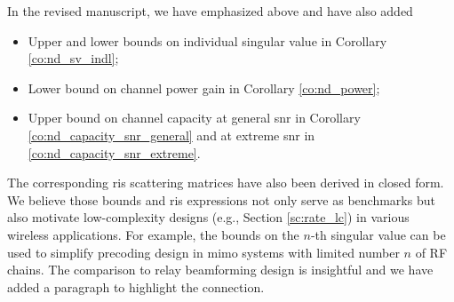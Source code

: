 \documentclass[
	fontsize=11pt,
	paper=a4,
	foldmarks=false
]{scrartcl}
\begin{document}
\begin{reviewer}
{		In the revised manuscript, we have emphasized above and have also added
		\begin{itemize}
			\item Upper and lower bounds on individual singular value in Corollary \ref{co:nd_sv_indl};
			\item Lower bound on channel power gain in Corollary \ref{co:nd_power};
			\item Upper bound on channel capacity at general \gls{snr} in Corollary \ref{co:nd_capacity_snr_general} and at extreme \gls{snr} in \ref{co:nd_capacity_snr_extreme}.
		\end{itemize}
		The corresponding \gls{ris} scattering matrices have also been derived in closed form.
		We believe those bounds and \gls{ris} expressions not only serve as benchmarks but also motivate low-complexity designs (e.g., Section \ref{sc:rate_lc}) in various wireless applications.
		For example, the bounds on the $n$-th singular value can be used to simplify precoding design in \gls{mimo} systems with limited number $n$ of RF chains.
		The comparison to relay beamforming design is insightful and we have added a paragraph to highlight the connection.
		}
\end{reviewer}
\end{document}
